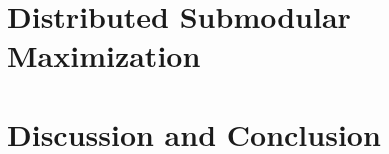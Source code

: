 \documentclass[11pt]{article}
\begin{document}
\section{Distributed Submodular Maximization}
\label{sec:distributed}

\section{Discussion and Conclusion}
\label{sec:conclude}




















%
\end{document}
